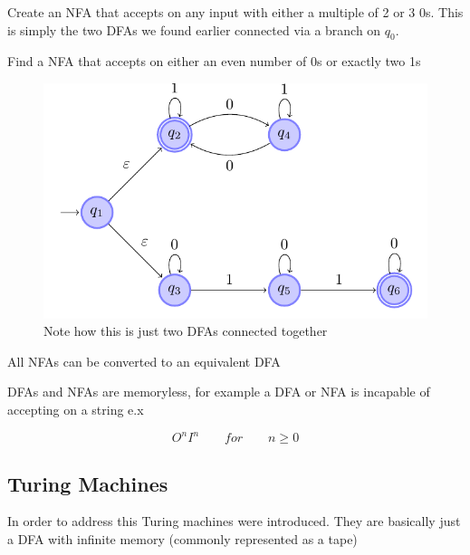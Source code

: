\documentclass[../notes.tex]{subfiles}
\begin{document}
\begin{example}
	Create an NFA that accepts on any input with either a multiple of 2 or 3 0s.
	This is simply the two DFAs we found earlier connected via a branch on $ q_0 $.

\end{example}

\begin{example}

	Find a NFA that accepts on either an even number of 0s or exactly two 1s
	\begin{figure}[H]
		\centering
		\includegraphics[width=0.8\linewidth]{img/image_2022-11-24-16-32-34.png}
		\caption{Note how this is just two DFAs connected together}
	\end{figure}
\end{example}


\begin{theorem}
	All NFAs can be converted to an equivalent DFA
\end{theorem}


DFAs and NFAs are memoryless, for example a DFA or NFA is incapable of accepting on a string e.x

\begin{equation}
	O^n I^n \qquad for \qquad n \ge 0
\end{equation}

\subsection{Turing Machines}

In order to address this Turing machines were introduced. They are basically just a DFA with infinite memory (commonly represented as a tape)
\end{document}

